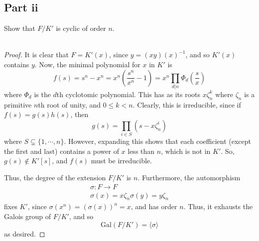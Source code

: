 \documentclass[12pt,reqno]{amsart}
\begin{document}
\subsection*{Part ii}
Show that $F/K'$ is cyclic of order $n$.
\\
\\
\begin{proof}
    It is clear that $F = K'(x)$, since $y = (xy)(x)^{-1}$, and so $K'(x)$
    contains $y$. Now, the minimal polynomial for $x$ in $K'$ is
    \[
        f(s) = s^n - x^n = x^n(\frac{s^n}{x^n}-1) =
        x^n\prod_{d|n}\Phi_d(\frac{s}{x})
    \]
    where $\Phi_d$ is the $d$th cyclotomic polynomial. This has as its roots
    $x\zeta_n^k$ where $\zeta_n$ is a primitive $n$th root of unity, and
    $0\leq k < n$. Clearly, this is irreducible, since if $f(s) = g(s)h(s)$,
    then
    \[
        g(s) = \prod_{i\in S}(s-x\zeta_n^i)
    \]
    where $S\subsetneq \{1,\cdots,n\}$. However, expanding this shows that each
    coefficient (except the first and last) contains a power of $x$ less than
    $n$, which is not in $K'$. So, $g(s)\not\in K'[s]$, and $f(s)$ must be
    irreducible.

    Thus, the degree of the extension $F/K'$ is $n$. Furthermore, the
    automorphism
    \[
\begin{aligned}
    \sigma:F\to F\\
    \sigma(x) = x\zeta_n
    \sigma(y) = y\zeta_n
\end{aligned}
    \]
    fixes $K'$, since $\sigma(x^n) = (\sigma(x))^n = x$, and has order $n$.
    Thus, it exhausts the Galois group of $F/K'$, and so
    \[
    \text{Gal}(F/K') = \langle \sigma\rangle
    \]
    as desired.
\end{proof}
\end{document}
